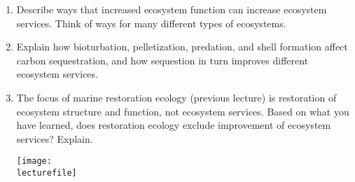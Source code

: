 \documentclass[letterpaper]{tufte-handout}
\newcommand\lecturefile{434_lecture05_instructor}
\begin{document}
\begin{enumerate}
	\item Describe ways that increased ecosystem function can increase ecosystem services. Think of ways for many different types of ecosystems.
	
	\item Explain how bioturbation, pelletization, predation, and shell formation affect carbon sequestration, and how sequestion in turn improves different ecosystem services.
	
	\item The focus of marine restoration ecology (previous lecture) is restoration of ecosystem structure and function, not ecosystem services. Based on what you have learned, does restoration ecology exclude improvement of ecosystem services?  Explain.
	
	\begin{marginfigure}
		\texttt{[image: \\lecturefile]}
	\end{marginfigure}
		
\end{enumerate}
\end{document}
